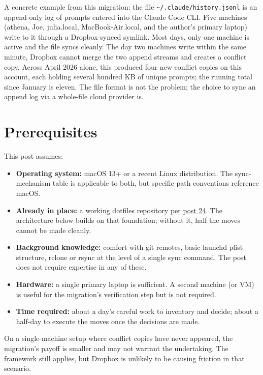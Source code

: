 \documentclass[
  11pt,
  letterpaper,
  DIV=11,
  numbers=noendperiod]{scrartcl}
\providecommand{\tightlist}{%
  \setlength{\itemsep}{0pt}\setlength{\parskip}{0pt}}\usepackage{longtable,booktabs,array}
\begin{document}
A concrete example from this migration: the file
\texttt{\textasciitilde{}/.claude/history.jsonl} is an append-only log
of prompts entered into the Claude Code CLI. Five machines (athena, Joe,
julia.local, MacBook-Air.local, and the author's primary laptop) write
to it through a Dropbox-synced symlink. Most days, only one machine is
active and the file syncs cleanly. The day two machines write within the
same minute, Dropbox cannot merge the two append streams and creates a
conflict copy. Across April 2026 alone, this produced four new conflict
copies on this account, each holding several hundred KB of unique
prompts; the running total since January is eleven. The file format is
not the problem; the choice to sync an append log via a whole-file cloud
provider is.

\section{Prerequisites}\label{prerequisites}

This post assumes:

\begin{itemize}
\tightlist
\item
  \textbf{Operating system:} macOS 13+ or a recent Linux distribution.
  The sync-mechanism table is applicable to both, but specific path
  conventions reference macOS.
\item
  \textbf{Already in place:} a working dotfiles repository per
  \href{https://focusonr.org/posts/24-setupdotfilesongithub/}{post 24}.
  The architecture below builds on that foundation; without it, half the
  moves cannot be made cleanly.
\item
  \textbf{Background knowledge:} comfort with git remotes, basic launchd
  plist structure, rclone or rsync at the level of a single sync
  command. The post does not require expertise in any of these.
\item
  \textbf{Hardware:} a single primary laptop is sufficient. A second
  machine (or VM) is useful for the migration's verification step but is
  not required.
\item
  \textbf{Time required:} about a day's careful work to inventory and
  decide; about a half-day to execute the moves once the decisions are
  made.
\end{itemize}

On a single-machine setup where conflict copies have never appeared, the
migration's payoff is smaller and may not warrant the undertaking. The
framework still applies, but Dropbox is unlikely to be causing friction
in that scenario.
\end{document}
